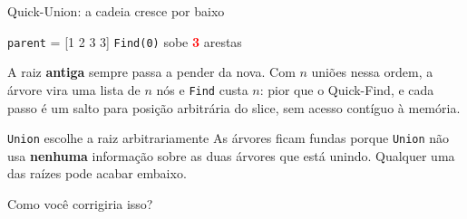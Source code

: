 \documentclass{beamer}
\newcommand{\hl}[1]{\textcolor{red}{\textbf{#1}}}
\begin{document}
\begin{frame}{Quick-Union: a cadeia cresce por baixo}
	\begin{center}
	\end{center}

	\vspace{0.1cm}
	\begin{center}
		\texttt{parent} = [1 2 3 3] \qquad \texttt{Find(0)} sobe \hl{3} arestas
	\end{center}

	\vspace{0.2cm}
	{\footnotesize A raiz \textbf{antiga} sempre passa a pender da nova. Com $n$
		uniões nessa ordem, a árvore vira uma lista de $n$ nós e \texttt{Find}
		custa $n$: pior que o Quick-Find, e cada passo é um salto para posição
		arbitrária do slice, sem acesso contíguo à memória.}
\end{frame}

\begin{frame}{\texttt{Union} escolhe a raiz arbitrariamente}
	As árvores ficam fundas porque \texttt{Union} não usa \textbf{nenhuma}
	informação sobre as duas árvores que está unindo. Qualquer uma das raízes
	pode acabar embaixo.

	\vspace{0.7cm}
	\begin{center}
		\Large Como você corrigiria isso?
	\end{center}
\end{frame}
\end{document}
